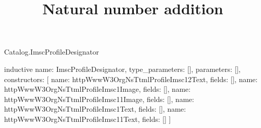 \begin{lexlean}{Catalog.ImscProfileDesignator}
\title{Natural number addition}
\begin{semanticmodule}
inductive{
  name: ImscProfileDesignator,
  type_parameters: [],
  parameters: [],
  constructors: [
    {name: httpWwwW3OrgNsTtmlProfileImsc12Text, fields: []},
    {name: httpWwwW3OrgNsTtmlProfileImsc1Image, fields: []},
    {name: httpWwwW3OrgNsTtmlProfileImsc11Image, fields: []},
    {name: httpWwwW3OrgNsTtmlProfileImsc1Text, fields: []},
    {name: httpWwwW3OrgNsTtmlProfileImsc11Text, fields: []}
  ]
}
\end{semanticmodule}
\end{lexlean}
